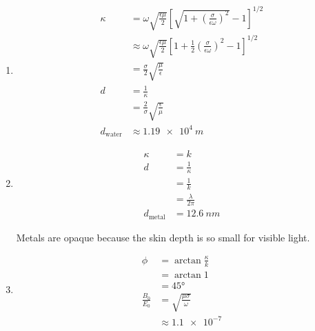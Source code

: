 \documentclass{article}
\begin{document}
\subsection{}

\begin{enumerate}
  \item

        \begin{align*}
          \kappa         & = \omega \sqrt{\frac{\epsilon \mu}{2}} \left[ \sqrt{1 + \left( \frac{\sigma}{\epsilon \omega} \right)^2} - 1 \right]^{1 / 2}            \\
                         & \approx \omega \sqrt{\frac{\epsilon \mu}{2}} \left[ 1 + \frac{1}{2} \left( \frac{\sigma}{\epsilon \omega} \right)^2 - 1 \right]^{1 / 2} \\
                         & = \frac{\sigma}{2} \sqrt{\frac{\mu}{\epsilon}}                                                                                          \\
          d              & = \frac{1}{\kappa}                                                                                                                      \\
                         & = \frac{2}{\sigma} \sqrt{\frac{\epsilon}{\mu}}                                                                                          \\
          d_\text{water} & \approx \qty{1.19e4}{m}
        \end{align*}

  \item

        \begin{align*}
          \kappa         & = k                     \\
          d              & = \frac{1}{\kappa}      \\
                         & = \frac{1}{k}           \\
                         & = \frac{\lambda}{2 \pi} \\
          d_\text{metal} & = \qty{12.6}{nm}
        \end{align*}

        Metals are opaque because the skin depth is so small for visible light.

  \item

        \begin{align*}
          \phi            & = \arctan \frac{\kappa}{k}         \\
                          & = \arctan 1                        \\
                          & = \ang{45}                         \\
          \frac{B_0}{E_0} & = \sqrt{\frac{\mu \sigma}{\omega}} \\
                          & \approx \num{1.1e-7}
        \end{align*}
\end{enumerate}
\end{document}
